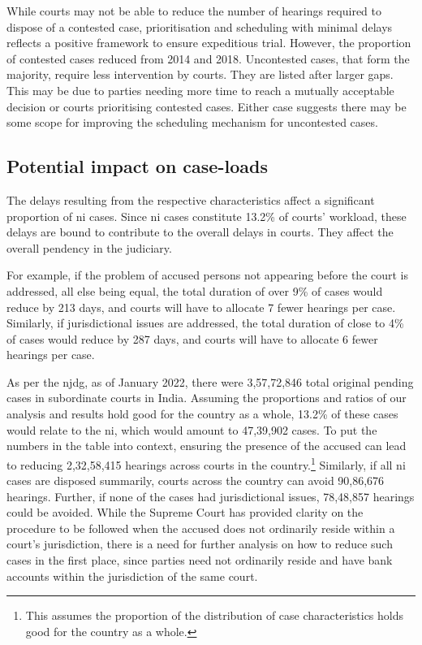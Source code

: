 While courts may not be able to reduce the number of hearings required to dispose of a contested case, prioritisation and scheduling with minimal delays reflects a positive framework to ensure expeditious trial. However, the proportion of contested cases reduced from 2014 and 2018. Uncontested cases, that form the majority, require less intervention by courts. They are listed after larger gaps. This may be due to parties needing more time to reach a mutually acceptable decision or courts prioritising contested cases. Either case suggests there may be some scope for improving the scheduling mechanism for uncontested cases.

\subsection{Potential impact on case-loads} \label{sec:impact-case-loads}

The delays resulting from the respective characteristics affect a significant proportion of \gls{ni} cases. Since \gls{ni} cases constitute 13.2\% of courts' workload, these delays are bound to contribute to the overall delays in courts. They affect the overall pendency in the judiciary. 

For example, if the problem of accused persons not appearing before the court is addressed, all else being equal, the total duration of over 9\% of cases would reduce by 213 days, and courts will have to allocate 7 fewer hearings per case. Similarly, if jurisdictional issues are addressed, the total duration of close to 4\% of cases would reduce by 287 days, and courts will have to allocate 6 fewer hearings per case.

As per the \gls{njdg}, as of January 2022, there were 3,57,72,846 total original pending cases in subordinate courts in India. Assuming the proportions and ratios of our analysis and results hold good for the country as a whole, 13.2\% of these cases would relate to the \gls{ni}, which would amount to 47,39,902 cases. To put the numbers in the table into context, ensuring the presence of the accused can lead to reducing 2,32,58,415 hearings across courts in the country.\footnote{This assumes the proportion of the distribution of case characteristics holds good for the country as a whole.} Similarly, if all \gls{ni} cases are disposed summarily, courts across the country can avoid 90,86,676 hearings. Further, if none of the cases had jurisdictional issues, 78,48,857 hearings could be avoided. While the Supreme Court has provided clarity on the procedure to be followed when the accused does not ordinarily reside within a court's jurisdiction, there is a need for further analysis on how to reduce such cases in the first place, since parties need not ordinarily reside and have bank accounts within the jurisdiction of the same court.

